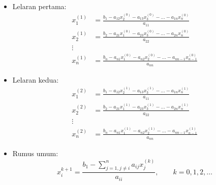 \documentclass[pdflatex,compress,mathserif]{beamer}
\begin{document}
\begin{frame}
	\begin{itemize}
		\item Lelaran pertama:
		\begin{align*}
			x_1^{(1)} &= \frac{b_1 - a_{12}x_2^{(0)} - a_{13}x_3^{(0)} - \dots - a_{1n}x_n^{(0)}}{a_{11}} \\
			x_2^{(1)} &= \frac{b_2 - a_{21}x_1^{(0)} - a_{23}x_3^{(0)} - \dots - a_{2n}x_n^{(0)}}{a_{22}} \\
			\vdots\\
			x_n^{(1)} &= \frac{b_n - a_{n1}x_1^{(0)} - a_{n2}x_2^{(0)} - \dots - a_{nn-1}x_{n-1}^{(0)}}{a_{nn}}
		\end{align*}
	\end{itemize}
\end{frame}

\begin{frame}
	\begin{itemize}
		\item Lelaran kedua:
		\begin{align*}
		x_1^{(2)} &= \frac{b_1 - a_{12}x_2^{(1)} - a_{13}x_3^{(1)} - \dots - a_{1n}x_n^{(1)}}{a_{11}} \\
		x_2^{(2)} &= \frac{b_2 - a_{21}x_1^{(1)} - a_{23}x_3^{(1)} - \dots - a_{2n}x_n^{(1)}}{a_{22}} \\
		\vdots\\
		x_n^{(2)} &= \frac{b_n - a_{n1}x_1^{(1)} - a_{n2}x_2^{(1)} - \dots - a_{nn-1}x_{n-1}^{(1)}}{a_{nn}}
		\end{align*}
	\end{itemize}
\end{frame}

\begin{frame}
	\begin{itemize}
		\item Rumus umum:
		\[ x_i^{k+1} = \frac{b_1 - \sum\limits_{j=1,j \neq i}^{n}a_{ij}x_j^{(k)}}{a_{ii}},\qquad k=0,1,2,\dots \]
	\end{itemize}
\end{frame}
\end{document}

